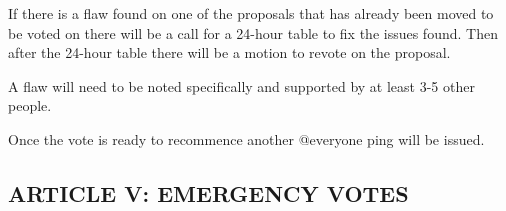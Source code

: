 \begin{deepEnumerate}
    \item If there is a flaw found on one of the proposals that has already been moved to be voted on there will be a call for a 24-hour table to fix the issues found. 
    Then after the 24-hour table there will be a motion to revote on the proposal.
    \begin{deepEnumerate}
        \item A flaw will need to be noted specifically and supported by at least 3-5 other people.
        \item Once the vote is ready to recommence another @everyone ping will be issued.
    \end{deepEnumerate}
\end{deepEnumerate}

\subsection{ARTICLE V: EMERGENCY VOTES}

